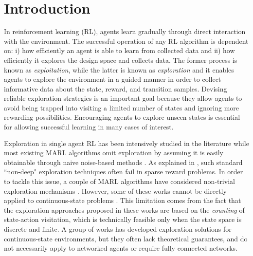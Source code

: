 \documentclass[lettersize,journal]{IEEEtran}
\begin{document}
\section{Introduction}
\label{sec:intro}

In reinforcement learning (RL), agents learn gradually through direct interaction with the environment. The successful operation of any RL algorithm is dependent on: i) how efficiently an agent is able to learn from collected data and ii) how efficiently it explores the design space and collects data. The former process is known as {\em exploitation}, while the latter is known as {\em exploration}  \cite{Exp_survey, Exp_survey2, sayed_2022} and it enables agents to explore the environment in a guided manner in order to collect informative data about the state, reward, and transition samples. Devising reliable exploration strategies is an important goal because they allow agents to  avoid being trapped into visiting a limited number of states and ignoring more rewarding possibilities. Encouraging agents to explore unseen states is essential for allowing successful learning in many cases of interest. \par 
Exploration in single agent RL has been intensively studied in the literature while most existing MARL algorithms  omit exploration by assuming it is easily obtainable through naive noise-based methods \cite{Q_mix, Rashid2,Alg1,Alg2}.  As explained in \cite{ISL}, such standard ``non-deep" exploration techniques  often fail in sparse reward problems. In order to tackle this issue, a couple of MARL algorithms have considered non-trivial exploration mechanisms \cite{justin, CMAE, LSVI_based}. However, some of these works cannot be directly applied to continuous-state problems \cite{justin}. This limitation comes from the fact  that the exploration approaches proposed in these works are based on the {\em counting}  of state-action visitation, which is technically feasible only when the state space is discrete and finite. A group of works \cite{CMAE,LSVI_based} has developed exploration solutions for continuous-state environments, but they often lack theoretical guarantees, and do not necessarily apply to networked agents or require fully connected networks. \par   
\end{document}
